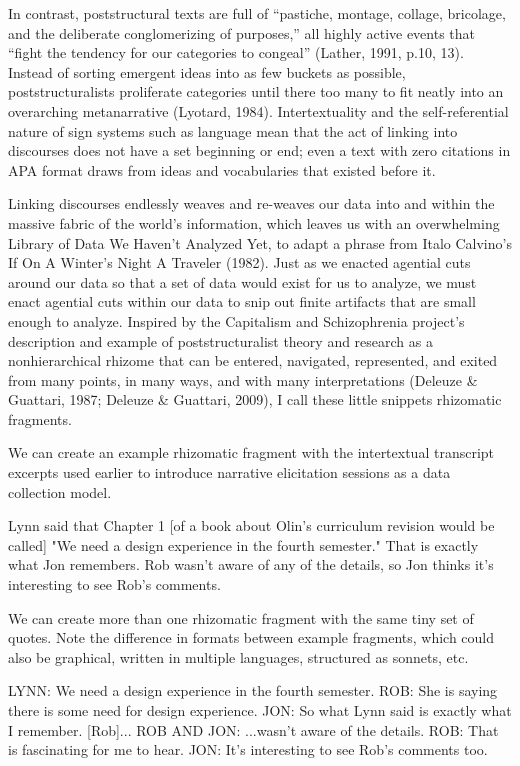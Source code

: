 In contrast, poststructural texts are full of “pastiche, montage, collage, bricolage, and the deliberate conglomerizing of purposes,” all highly active events that “fight the tendency for our categories to congeal” (Lather, 1991, p.10, 13). Instead of sorting emergent ideas into as few buckets as possible, poststructuralists proliferate categories until there too many to fit neatly into an overarching metanarrative (Lyotard, 1984). Intertextuality and the self-referential nature of sign systems such as language mean that the act of linking into discourses does not have a set beginning or end; even a text with zero citations in APA format draws from ideas and vocabularies that existed before it.

Linking discourses endlessly weaves and re-weaves our data into and within the massive fabric of the world’s information, which leaves us with an overwhelming Library of Data We Haven’t Analyzed Yet, to adapt a phrase from Italo Calvino’s If On A Winter’s Night A Traveler (1982). Just as we enacted agential cuts around our data so that a set of data would exist for us to analyze, we must enact agential cuts within our data to snip out finite artifacts that are small enough to analyze. Inspired by the Capitalism and Schizophrenia project’s description and example of poststructuralist theory and research as a nonhierarchical rhizome that can be entered, navigated, represented, and exited from many points, in many ways, and with many interpretations (Deleuze & Guattari, 1987; Deleuze & Guattari, 2009), I call these little snippets rhizomatic fragments.

We can create an example rhizomatic fragment with the intertextual transcript excerpts used earlier to introduce narrative elicitation sessions as a data collection model.

Lynn said that Chapter 1 [of a book about Olin's curriculum revision would be called] "We need a design experience in the fourth semester." That is exactly what Jon remembers. Rob wasn't aware of any of the details, so Jon thinks it’s interesting to see Rob's comments.

We can create more than one rhizomatic fragment with the same tiny set of quotes. Note the difference in formats between example fragments, which could also be graphical, written in multiple languages, structured as sonnets, etc.

LYNN: We need a design experience in the fourth semester.
ROB: She is saying there is some need for design experience.
JON: So what Lynn said is exactly what I remember. [Rob]...
ROB AND JON: ...wasn't aware of the details.
ROB: That is fascinating for me to hear.
JON: It's interesting to see Rob's comments too.

